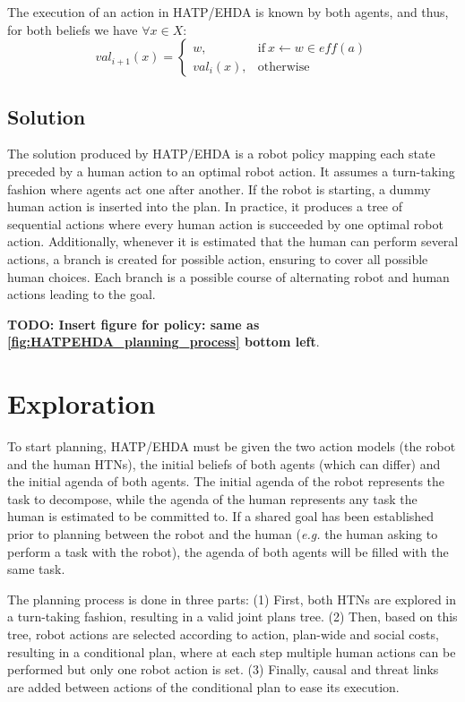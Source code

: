 The execution of an action in HATP/EHDA is known by both agents, and thus, for both beliefs we have $\forall x \in X$: 
\begin{equation}
    val_{i+1}(x) = \left\{ 
    \begin{array}{ll}
        w, & \mbox{if} ~ x \leftarrow w \in \textit{eff}(a)   \\ 
        val_i(x), & \mbox{otherwise}
    \end{array}\right.
\end{equation}


\subsection{Solution}

The solution produced by HATP/EHDA is a robot policy mapping each state preceded by a human action to an optimal robot action. It assumes a turn-taking fashion where agents act one after another. If the robot is starting, a dummy human action is inserted into the plan. In practice, it produces a tree of sequential actions where every human action is succeeded by one optimal robot action. Additionally, whenever it is estimated that the human can perform several actions, a branch is created for possible action, ensuring to cover all possible human choices. Each branch is a possible course of alternating robot and human actions leading to the goal.

\textbf{TODO: Insert figure for policy: same as \ref{fig:HATPEHDA_planning_process} bottom left}.


\section{Exploration}

To start planning, HATP/EHDA must be given the two action models (the robot and the human HTNs), the initial beliefs of both agents (which can differ) and the initial agenda of both agents. The initial agenda of the robot represents the task to decompose, while the agenda of the human represents any task the human is estimated to be committed to. If a shared goal has been established prior to planning between the robot and the human (\textit{e.g.} the human asking to perform a task with the robot), the agenda of both agents will be filled with the same task.

The planning process is done in three parts: (1) First, both HTNs are explored in a turn-taking fashion, resulting in a valid joint plans tree. (2) Then, based on this tree, robot actions are selected according to action, plan-wide and social costs, resulting in a conditional plan, where at each step multiple human actions can be performed but only one robot action is set. (3) Finally, causal and threat links are added between actions of the conditional plan to ease its execution.


